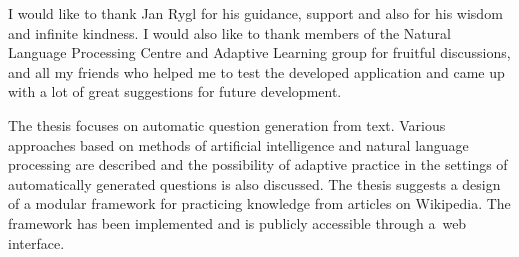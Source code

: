 \documentclass[12pt, twoside]{fithesis2}
\renewcommand{\_}{\leavevmode \kern0.07em\vbox{\hrule width0.4em}}
\newcounter{choice}
\begin{document}
\FrontMatter
\ThesisTitlePage

\begin{ThesisDeclaration}
\DeclarationText
\AdvisorName
\end{ThesisDeclaration}

\begin{ThesisThanks}
  I would like to thank Jan Rygl
  for his guidance, support and also for his wisdom and infinite kindness.
  I would also like to thank members of the Natural Language Processing Centre
  and Adaptive Learning group for fruitful discussions,
  and all my friends who helped me to test the developed application
  and came up with a lot of great suggestions for future development.
\end{ThesisThanks}

\begin{ThesisAbstract}
The thesis focuses on automatic question generation from text.
Various approaches based on methods of artificial intelligence and natural language processing are described and the possibility of adaptive practice in the settings of automatically generated questions is also discussed.
The thesis suggests a design of a modular framework for practicing knowledge from articles on Wikipedia.
The framework has been implemented and is publicly accessible through a~web interface.
\end{ThesisAbstract}


\end{document}
